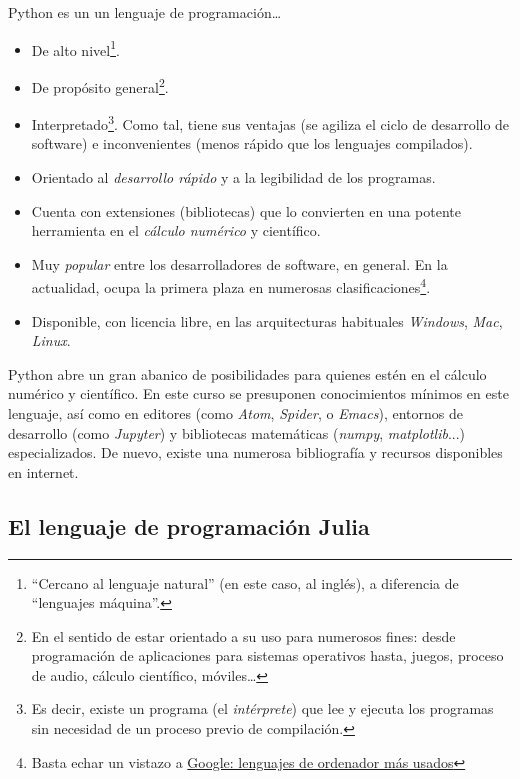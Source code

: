 Python es un un lenguaje de programación\ldots{}
\begin{itemize}
\item De alto nivel\footnote{``Cercano al lenguaje
    natural'' (en este caso, al inglés), a diferencia de
    ``lenguajes máquina''.}.
\item De propósito general\footnote{En el sentido de estar orientado a
    su uso para numerosos fines: desde programación de aplicaciones para
    sistemas operativos hasta, juegos, proceso de audio, cálculo
    científico, móviles\ldots{}}.
\item Interpretado\footnote{Es decir, existe un programa (el
    \emph{intérprete}) que lee y ejecuta los programas sin necesidad
    de un proceso previo de compilación.}. Como tal, tiene sus ventajas
  (se agiliza el ciclo de desarrollo de software) e inconvenientes
  (menos rápido que los lenguajes compilados).
\item Orientado al \emph{desarrollo rápido} y a la legibilidad de los programas.
\item Cuenta con extensiones (bibliotecas) que lo convierten en una
      potente herramienta en el \emph{cálculo numérico} y científico.
    \item Muy \emph{popular} entre los desarrolladores de software, en
      general. En la actualidad, ocupa la primera plaza en numerosas
      clasificaciones\footnote{Basta echar un vistazo a \href{https://www.google.com/search?channel=fs&client=ubuntu&q=lenguajes+de+ordenador+m\%C3\%A1s+usados}{Google: lenguajes de ordenador más usados}}.
    \item Disponible, con licencia libre, en las arquitecturas habituales \emph{Windows},
  \emph{Mac}, \emph{Linux}.
\end{itemize}

Python abre un gran abanico de posibilidades para quienes estén
en el cálculo numérico y científico. En este
curso se presuponen conocimientos mínimos en este lenguaje, así como
en editores (como \textit{Atom}, \textit{Spider}, o \textit{Emacs}),
entornos de desarrollo (como \textit{Jupyter}) y bibliotecas
matemáticas (\textit{numpy}, \textit{matplotlib}...)
especializados. De nuevo, existe una numerosa bibliografía y recursos
disponibles en internet.

\subsection{El lenguaje de programación Julia}
\label{sec:01:Julia}

